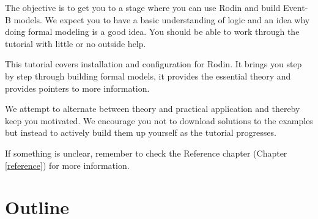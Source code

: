 
The objective is to get you to a stage where you can use Rodin and build Event-B models.  We expect you to have a basic understanding of logic and an idea why doing formal modeling is a good idea.  You should be able to work through the tutorial with little or no outside help.

This tutorial covers installation and configuration for Rodin. It brings you step by step through building formal models, it provides the essential theory and provides pointers to more information.

We attempt to alternate between theory and practical application and thereby keep you motivated.  We encourage you not to download solutions to the examples but instead to actively build them up yourself as the tutorial progresses.

If something is unclear, remember to check the Reference chapter (Chapter \ref{reference}) for more information.

\section{Outline}

